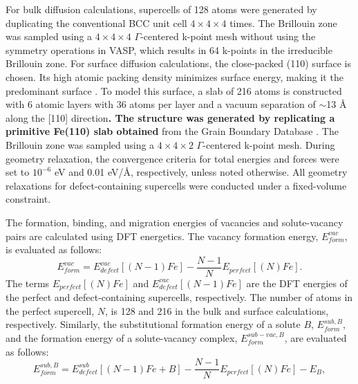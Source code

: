 \documentclass[preprint,12pt]{elsarticle}
\providecommand{\DIFaddtex}[1]{{\bf #1}} %
\providecommand{\DIFdeltex}[1]{} %
\providecommand{\DIFaddbegin}{\protect\color{blue}} %
\providecommand{\DIFaddend}{\protect\color{black}} %
\providecommand{\DIFdelbegin}{\protect\color{red}} %
\providecommand{\DIFdelend}{\protect\color{black}} %
\providecommand{\DIFadd}[1]{\texorpdfstring{\DIFaddtex{#1}}{#1}} %
\providecommand{\DIFdel}[1]{\texorpdfstring{\DIFdeltex{#1}}{}} %
\newcommand{\DIFscaledelfig}{0.5}
\newlength{\DIFdelgraphicswidth} %
\newlength{\DIFdelgraphicsheight} %
\newcommand{\DIFaddincludegraphics}[2][]{{\color{blue}\fbox{\DIFOincludegraphics[#1]{#2}}}} %
\newcommand{\DIFdelincludegraphics}[2][]{%
\sbox{\DIFdelgraphicsbox}{\DIFOincludegraphics[#1]{#2}}%
\settoboxwidth{\DIFdelgraphicswidth}{\DIFdelgraphicsbox} %
\settoboxtotalheight{\DIFdelgraphicsheight}{\DIFdelgraphicsbox} %
\scalebox{\DIFscaledelfig}{%
\parbox[b]{\DIFdelgraphicswidth}{\usebox{\DIFdelgraphicsbox}\\[-\baselineskip] \rule{\DIFdelgraphicswidth}{0em}}\llap{\resizebox{\DIFdelgraphicswidth}{\DIFdelgraphicsheight}{%
\setlength{\unitlength}{\DIFdelgraphicswidth}%
\begin{picture}(1,1)%
\thicklines\linethickness{2pt} %
{\color[rgb]{1,0,0}\put(0,0){\framebox(1,1){}}}%
{\color[rgb]{1,0,0}\put(0,0){\line( 1,1){1}}}%
{\color[rgb]{1,0,0}\put(0,1){\line(1,-1){1}}}%
\end{picture}%
}\hspace*{3pt}}} %
} %
\DeclareRobustCommand{\DIFaddbegin}{\DIFOaddbegin \let\includegraphics\DIFaddincludegraphics} %
\DeclareRobustCommand{\DIFaddend}{\DIFOaddend \let\includegraphics\DIFOincludegraphics} %
\DeclareRobustCommand{\DIFdelbegin}{\DIFOdelbegin \let\includegraphics\DIFdelincludegraphics} %
\DeclareRobustCommand{\DIFdelend}{\DIFOaddend \let\includegraphics\DIFOincludegraphics} %
\begin{document}
For bulk diffusion calculations, supercells of 128 atoms were generated by duplicating the conventional BCC unit cell $4\times4\times4$ times.  The Brillouin zone was sampled using a $4\times4\times4$ $\Gamma$-centered k-point mesh without using the symmetry operations in VASP, which results in 64 k-points in the irreducible Brillouin zone. 
For surface diffusion calculations, the close-packed (110) surface is chosen. Its high atomic packing density minimizes surface energy, making it the predominant surface \cite{tran2016surface}. To model this surface, a slab of 216 atoms is constructed with 6 atomic layers with 36 atoms per layer and a vacuum separation of $\sim$13 {\AA} along the [110] direction\DIFdelbegin \DIFdel{, utilizing initial input }\DIFdelend \DIFaddbegin \DIFadd{. The structure was generated by replicating a primitive Fe(110) slab obtained }\DIFaddend from the Grain Boundary Database \cite{tran2016surface, zheng_grain_2020}. The Brillouin zone was sampled using a $4\times4\times2$ $\Gamma$-centered k-point mesh. During geometry relaxation, the convergence criteria for total energies and forces were set to $10^{-6}$ eV and 0.01 eV/{\AA}, respectively, unless noted otherwise. All geometry relaxations for defect-containing supercells were conducted under a fixed-volume constraint.

The formation, binding, and migration energies of vacancies and solute-vacancy pairs are calculated using DFT energetics. The vacancy formation energy, $E_{form}^{vac}$, is evaluated as follows:
\begin{equation}
\label{eq_Ef_vac}
   E_{form}^{vac} = E^{vac}_{defect}[(N-1)Fe] - \frac{N-1}{N} E_{perfect}[(N) Fe] .
\end{equation}
The terms $E_{perfect}[(N) Fe]$ and $E^{vac}_{defect}[(N-1)Fe]$ are the DFT energies of the perfect and defect-containing supercells, respectively. The number of atoms in the perfect supercell, $N$, is 128 and 216 in the bulk and surface calculations, respectively. Similarly, the substitutional formation energy of a solute $B$, $E_{form}^{sub,B}$, and the formation energy of a solute-vacancy complex, $E_{form}^{sub-vac,B}$, are evaluated as follows:
\begin{equation}
\label{eq_Ef_sub}
    E_{form}^{sub,B} = E_{defect}^{sub}[(N-1)Fe + B] - \frac{N-1}{N}E_{perfect}[(N) Fe] - E_{B},
\end{equation}
\end{document}
